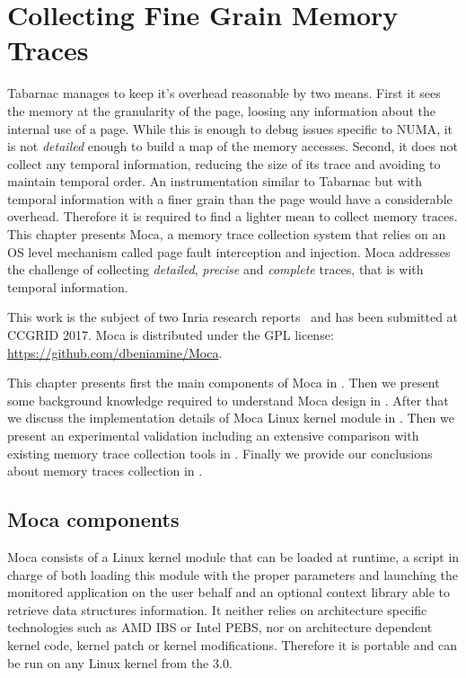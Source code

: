 \chapter{Collecting Fine Grain Memory Traces}
\label{chap:moca}

\gls{Tabarnac} manages to keep it's overhead reasonable by two means.
First it sees the memory at the granularity of the page, loosing any information about the internal use of a page.
While this is enough to debug issues specific to \gls{NUMA}, it is not \emph{detailed} enough to build a map of the memory accesses.
Second, it does not collect any temporal information, reducing the size of its trace and avoiding to maintain temporal order.
An instrumentation similar to \gls{Tabarnac} but with temporal information with a finer grain than the page would have a considerable overhead.
Therefore it is required to find a lighter mean to collect memory traces.
This chapter presents \gls{Moca}, a memory trace collection system that  relies on an \gls{OS} level mechanism called page fault interception and injection.
\gls{Moca} addresses the challenge of collecting \emph{detailed}, \emph{precise} and \emph{complete} traces, that is with temporal information.

This work is the subject of two Inria research reports~\cite{Beniamine15Memory,Beniamine16Moca} and has been submitted at \gls{CCGRID} 2017.
\gls{Moca} is distributed under the \gls{GPL} license: \url{https://github.com/dbeniamine/Moca}.

This chapter presents first the main components of \gls{Moca} in .
Then we present some background knowledge required to understand \gls{Moca} design in .
After that we discuss the implementation details of \gls{Moca} \gls{Linux} kernel module in .
Then we present an experimental validation including an extensive comparison with existing memory trace collection tools in .
Finally we provide our conclusions about memory traces collection in .

\section{Moca components}
\label{sec:moca-components}

\gls{Moca} consists of a Linux kernel module that can be loaded at runtime,  a script in charge of both loading this module with the proper parameters and launching the monitored application on the user behalf and an optional context library able to retrieve data structures information.
It neither relies on architecture specific technologies such as \gls{AMD} \gls{IBS} or \gls{Intel} \gls{PEBS}, nor on architecture dependent kernel code, kernel patch or kernel modifications.
Therefore it is portable and can be run on any Linux kernel from the $3.0$.

